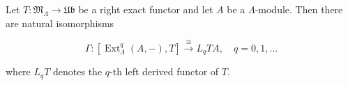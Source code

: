 Let $T : \mathfrak{M}_\Lambda \rightarrow \mathfrak{Ub}$ be a right exact functor and let $A$ be a $\Lambda$-module. Then there are natural isomorphisms

$$\Gamma : [\operatorname{Ext}_\Lambda^q(A, -), T] \xrightarrow{\cong} L_q TA, \quad q = 0, 1, \dots$$

where $L_q T$ denotes the $q$-th left derived functor of $T$.
